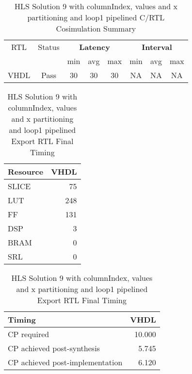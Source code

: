 \begin{table}[H]
	\centering
	\begin{tabular}{|c|c|c|c|c|c|c|c|}
		\hline
		\multicolumn{1}{|c|}{RTL} & \multicolumn{1}{|c|}{Status} & \multicolumn{3}{c|}{\textbf{Latency}} & \multicolumn{3}{c|}{\textbf{Interval}} \\
		&  & min & avg & max & min & avg & max \\
		\hline
		VHDL & Pass & 30 & 30 & 30 & NA & NA & NA \\
		\hline
	\end{tabular}
	\caption{HLS Solution 9 with columnIndex, values and x partitioning and loop1 pipelined C/RTL Cosimulation Summary }
	\label{tab:hls-solution-7-loop1-pipeline-cosimulation-summary}
\end{table}

\begin{table}[H]
	\centering
	\begin{minipage}[t]{0.45\linewidth}
		\centering
		\begin{tabular}{|l|r|}
			\hline
			\textbf{Resource} & \textbf{VHDL} \\
			\hline
			SLICE & 75 \\
			\hline
			LUT & 248 \\
			\hline
			FF & 131 \\
			\hline
			DSP & 3 \\
			\hline
			BRAM & 0 \\
			\hline
			SRL & 0 \\
			\hline
		\end{tabular}
		\caption{HLS Solution 9 with columnIndex, values and x partitioning and loop1 pipelined Export RTL Resource Usage}
		\label{tab:hls-solution-7-loop1-pipeline-export-rtl-resoruce-usage}
	\end{minipage}
	\hfill
	\begin{minipage}[t]{0.45\linewidth}
		\centering
		\begin{tabular}{|l|r|}
			\hline
			\textbf{Timing} & \textbf{VHDL} \\
			\hline
			CP required & 10.000 \\
			\hline
			CP achieved post-synthesis & 5.745 \\
			\hline
			CP achieved post-implementation & 6.120 \\
			\hline
		\end{tabular}
		\caption{HLS Solution 9 with columnIndex, values and x partitioning and loop1 pipelined Export RTL Final Timing}
		\label{tab:hls-solution-7-loop1-pipeline-export-rtl-final-timing}
	\end{minipage}
\end{table}